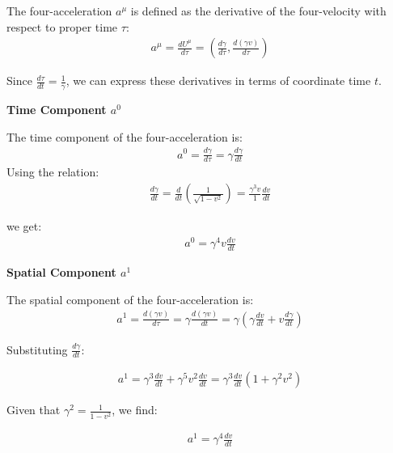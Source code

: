 \documentclass[11pt,letterpaper]{book}
\begin{document}
            The four-acceleration \( a^\mu \) is defined as the derivative of the four-velocity with respect to proper time \( \tau \):
            \begin{align}
            a^\mu = \frac{dU^\mu}{d\tau} = \left(\frac{d\gamma}{d\tau}, \frac{d(\gamma v)}{d\tau}\right)
            \end{align}
            
            Since \( \frac{d\tau}{dt} = \frac{1}{\gamma} \), we can express these derivatives in terms of coordinate time \( t \).
            
            \textbf{Time Component \( a^0 \)}
            
            The time component of the four-acceleration is:
            \begin{align}
            a^0 = \frac{d\gamma}{d\tau} = \gamma \frac{d\gamma}{dt}
            \end{align}
            Using the relation:
            \begin{align}
            \frac{d\gamma}{dt} = \frac{d}{dt} \left(\frac{1}{\sqrt{1 - v^2}}\right) = \frac{\gamma^3 v}{1} \frac{dv}{dt}
            \end{align}
            
            we get:
            \begin{align}
            a^0 = \gamma^4 v \frac{dv}{dt}
            \end{align}
            
            \textbf{Spatial Component \( a^1 \)}
            
            The spatial component of the four-acceleration is:
            \begin{align}
            a^1 = \frac{d(\gamma v)}{d\tau} = \gamma \frac{d(\gamma v)}{dt} = \gamma \left( \gamma \frac{dv}{dt} + v \frac{d\gamma}{dt} \right)
            \end{align}
            
            Substituting \( \frac{d\gamma}{dt} \):
            
            \begin{align}
            a^1 = \gamma^3 \frac{dv}{dt} + \gamma^5 v^2 \frac{dv}{dt} = \gamma^3 \frac{dv}{dt} \left(1 + \gamma^2 v^2\right)
            \end{align}
            
            Given that \( \gamma^2 = \frac{1}{1 - v^2} \), we find:
            
            \begin{align}
            a^1 = \gamma^4 \frac{dv}{dt}
            \end{align}
            
\end{document}
